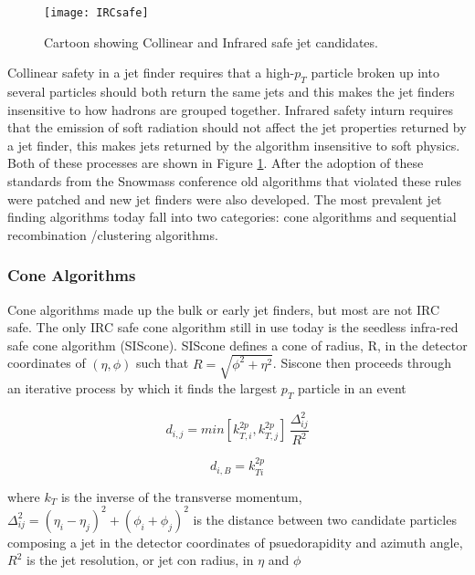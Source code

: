 \begin{figure}[h]
\texttt{[image: IRCsafe]}
\centering
\caption{Cartoon showing Collinear and Infrared safe jet candidates\cite{Blazey:2000qt}.}
\label{fig:IRCsafe}
\end{figure}


Collinear safety in a jet finder requires that a high-$p_{T}$ particle broken up into several particles should both return the same jets and this makes the jet finders insensitive to how hadrons are grouped together.  Infrared safety inturn requires that the emission of soft radiation should not affect the jet properties returned by a jet finder, this makes jets returned by the algorithm insensitive to soft physics.  Both of these processes are shown in Figure \ref{fig:IRCsafe}.  After the adoption of these standards from the Snowmass conference old algorithms that violated these rules were patched and new jet finders were also developed.  The most prevalent jet finding algorithms today fall into two categories: cone algorithms and sequential recombination /clustering algorithms.

\subsubsection{Cone Algorithms}

Cone algorithms made up the bulk or early jet finders, but most are not IRC safe.  The only IRC safe cone algorithm still in use today is the seedless infra-red safe cone algorithm (SIScone).  SIScone defines a cone of radius, R, in the detector coordinates of $(\eta,\phi)$ such that $R = \sqrt{\phi^{2} + \eta^{2}}$.  Siscone then proceeds through an iterative process by which it finds the largest $p_{T}$ particle in an event

\begin{equation}
d_{i,j} = min[k^{2p}_{T,i},k^{2p}_{T,j}] \, \frac{\Delta^{2}_{ij}}{R^{2}}
\label{eq:JetAlgo}
\end{equation}

\begin{equation}
d_{i,B} = k^{2p}_{Ti}
\label{eq:MinJet}
\end{equation}

\noindent
where $k_{T}$ is the inverse of the transverse momentum, $\Delta^{2}_{ij} = (\eta_{i} - \eta_{j})^{2} + (\phi_{i} + \phi_{j})^{2}$ is the distance between two candidate particles composing a jet in the detector coordinates of psuedorapidity and azimuth angle, $R^{2}$ is the jet resolution, or jet con radius, in $\eta$ and $\phi$

